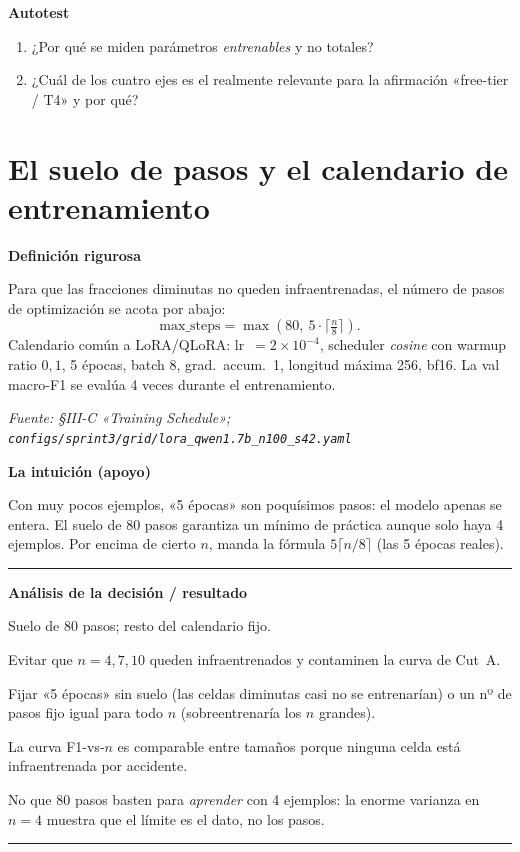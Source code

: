 \documentclass[11pt,a4paper]{article}
\newcommand{\nivel}[1]{\medskip\noindent\textbf{\textcolor{blue!45!black}{#1}}\par\nopagebreak\smallskip}
\newcommand{\fuente}[1]{\nopagebreak\par\hfill{\footnotesize\textit{Fuente: #1}}\par}
\newenvironment{analisis}{%
  \medskip\par\noindent\rule{\linewidth}{0.4pt}\par\nopagebreak
  \textbf{Análisis de la decisión / resultado}\par\nopagebreak\smallskip
  \begin{description}[leftmargin=2.6cm,style=nextline,font=\bfseries]
}{%
  \end{description}\noindent\rule{\linewidth}{0.4pt}\par\medskip
}
\begin{document}
\nivel{Autotest}
\begin{enumerate}[nosep]
  \item ¿Por qué se miden parámetros \emph{entrenables} y no totales?
  \item ¿Cuál de los cuatro ejes es el realmente relevante para la afirmación «free-tier / T4» y por
        qué?
\end{enumerate}

\section{El suelo de pasos y el calendario de entrenamiento}\label{sec:maxsteps}

\nivel{Definición rigurosa}
Para que las fracciones diminutas no queden infraentrenadas, el número de pasos de optimización se
acota por abajo:
\[
\text{max\_steps} = \max\!\left(80,\ 5\cdot\Big\lceil \tfrac{n}{8} \Big\rceil\right).
\]
Calendario común a LoRA/QLoRA: lr~$=2\times10^{-4}$, scheduler \emph{cosine} con warmup ratio
$0{,}1$, 5 épocas, batch 8, grad.\ accum.\ 1, longitud máxima 256, bf16. La val macro-F1 se evalúa 4
veces durante el entrenamiento.
\fuente{\S III-C «Training Schedule»; \texttt{configs/sprint3/grid/lora\_qwen1.7b\_n100\_s42.yaml}}

\nivel{La intuición (apoyo)}
Con muy pocos ejemplos, «5 épocas» son poquísimos pasos: el modelo apenas se entera. El suelo de
80 pasos garantiza un mínimo de práctica aunque solo haya 4 ejemplos. Por encima de cierto $n$, manda
la fórmula $5\lceil n/8\rceil$ (las 5 épocas reales).

\begin{analisis}
  \item[Qué] Suelo de 80 pasos; resto del calendario fijo.
  \item[Por qué] Evitar que $n{=}4,7,10$ queden infraentrenados y contaminen la curva de Cut~A.
  \item[Alternativas descartadas] Fijar «5 épocas» sin suelo (las celdas diminutas casi no se
        entrenarían) o un nº de pasos fijo igual para todo $n$ (sobreentrenaría los $n$ grandes).
  \item[Qué significa] La curva F1-vs-$n$ es comparable entre tamaños porque ninguna celda está
        infraentrenada por accidente.
  \item[Qué NO significa] No que 80 pasos basten para \emph{aprender} con 4 ejemplos: la enorme
        varianza en $n{=}4$ muestra que el límite es el dato, no los pasos.
\end{analisis}
\end{document}
